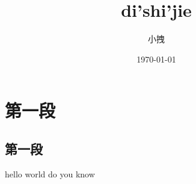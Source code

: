 \documentclass{article}
\title{di'shi'jie}
\date{\today}
\author{小拽}
\begin{document}
\maketitle
\section{第一段}
\subsection{第一段}
hello world do you know
\end{document}
